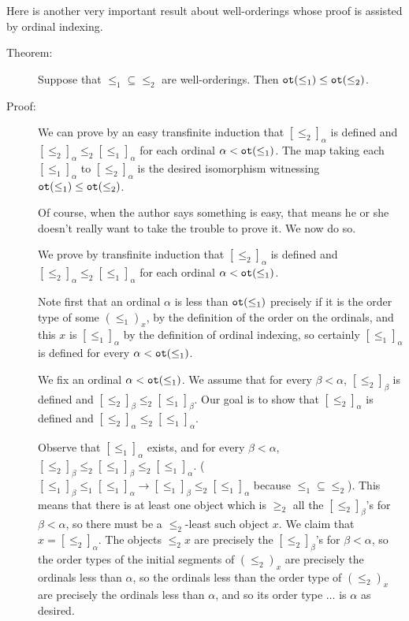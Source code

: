 \documentclass[12pt]{book}
\begin{document}
Here is another very important result about well-orderings whose proof is assisted by ordinal indexing.

\begin{description}

\item[Theorem:]  Suppose that $\leq_1 \subseteq \leq_2$ are well-orderings.
Then ${\tt ot}(\leq_1) \leq {\tt ot}(\leq_2)$.

\item[Proof:] We can prove by an easy transfinite induction that
$[\leq_2]_{\alpha}$ is defined and $[\leq_2]_{\alpha} \leq_2
[\leq_1]_{\alpha}$ for each ordinal $\alpha < {\tt ot}(\leq_1)$.  The
map taking each $[\leq_1]_{\alpha}$ to $[\leq_2]_{\alpha}$ is the desired
isomorphism witnessing ${\tt ot}(\leq_1) \leq {\tt ot}(\leq_2)$.

Of course, when the author says something is easy, that means he or
she doesn't really want to take the trouble to prove it.  We now do
so.

We prove by transfinite induction that $[\leq_2]_{\alpha}$ is defined
and $[\leq_2]_{\alpha} \leq_2 [\leq_1]_{\alpha}$ for each ordinal
$\alpha < {\tt ot}(\leq_1)$.

Note first that an ordinal $\alpha$ is less than ${\tt ot}(\leq_1)$
precisely if it is the order type of some $(\leq_1)_x$, by the
definition of the order on the ordinals, and this $x$ is
$[\leq_1]_{\alpha}$ by the definition of ordinal indexing, so
certainly $[\leq_1]_{\alpha}$ is defined for every $\alpha<{\tt
ot}(\leq_1)$.

We fix an ordinal $\alpha<{\tt ot}(\leq_1)$.  We assume that for every
$\beta<\alpha$, $[\leq_2]_{\beta}$ is defined and $[\leq_2]_{\beta}
\leq_2 [\leq_1]_{\beta}$.  Our goal is to show that
$[\leq_2]_{\alpha}$ is defined and $[\leq_2]_{\alpha} \leq_2
[\leq_1]_{\alpha}$.

Observe that $[\leq_1]_{\alpha}$ exists, and for every $\beta<\alpha$,
$[\leq_2]_{\beta}\leq_2[\leq_1]_{\beta}\leq_2[\leq_1]_{\alpha}$.
($[\leq_1]_{\beta}\leq_1[\leq_1]_{\alpha} \rightarrow
[\leq_1]_{\beta}\leq_2[\leq_1]_{\alpha}$ because $\leq_1 \subseteq
\leq_2$).  This means that there is at least one object which is
$\geq_2$ all the $[\leq_2]_{\beta}$'s for $\beta<\alpha$, so there
must be a $\leq_2$-least such object $x$.  We claim that
$x=[\leq_2]_{\alpha}$.  The objects $\leq_2 x$ are precisely the
$[\leq_2]_{\beta}$'s for $\beta<\alpha$, so the order types of the
initial segments of $(\leq_2)_x$ are precisely the ordinals less than
$\alpha$, so the ordinals less than the order type of $(\leq_2)_x$ are
precisely the ordinals less than $\alpha$, and so its order type
$\ldots$ is $\alpha$ as desired.

\end{description}
\end{document}

